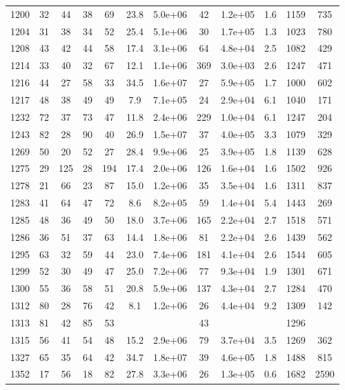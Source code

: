 \begin{table}
\begin{tabular}{cccccccccccc}
1200 & 32 & 44 & 38 & 69 & 23.8 & 5.0e+06 & 42 & 1.2e+05 & 1.6 & 1159 & 735 \\
1204 & 31 & 38 & 34 & 52 & 25.4 & 5.1e+06 & 30 & 1.7e+05 & 1.3 & 1023 & 780 \\
1208 & 43 & 42 & 44 & 58 & 17.4 & 3.1e+06 & 64 & 4.8e+04 & 2.5 & 1082 & 429 \\
1214 & 33 & 40 & 32 & 67 & 12.1 & 1.1e+06 & 369 & 3.0e+03 & 2.6 & 1247 & 471 \\
1216 & 44 & 27 & 58 & 33 & 34.5 & 1.6e+07 & 27 & 5.9e+05 & 1.7 & 1000 & 602 \\
1217 & 48 & 38 & 49 & 49 & 7.9 & 7.1e+05 & 24 & 2.9e+04 & 6.1 & 1040 & 171 \\
1232 & 72 & 37 & 73 & 47 & 11.8 & 2.4e+06 & 229 & 1.0e+04 & 6.1 & 1247 & 204 \\
1243 & 82 & 28 & 90 & 40 & 26.9 & 1.5e+07 & 37 & 4.0e+05 & 3.3 & 1079 & 329 \\
1269 & 50 & 20 & 52 & 27 & 28.4 & 9.9e+06 & 25 & 3.9e+05 & 1.8 & 1139 & 628 \\
1275 & 29 & 125 & 28 & 194 & 17.4 & 2.0e+06 & 126 & 1.6e+04 & 1.6 & 1502 & 926 \\
1278 & 21 & 66 & 23 & 87 & 15.0 & 1.2e+06 & 35 & 3.5e+04 & 1.6 & 1311 & 837 \\
1283 & 41 & 64 & 47 & 72 & 8.6 & 8.2e+05 & 59 & 1.4e+04 & 5.4 & 1443 & 269 \\
1285 & 48 & 36 & 49 & 50 & 18.0 & 3.7e+06 & 165 & 2.2e+04 & 2.7 & 1518 & 571 \\
1286 & 36 & 51 & 37 & 63 & 14.4 & 1.8e+06 & 81 & 2.2e+04 & 2.6 & 1439 & 562 \\
1295 & 63 & 32 & 59 & 44 & 23.0 & 7.4e+06 & 181 & 4.1e+04 & 2.6 & 1544 & 605 \\
1299 & 52 & 30 & 49 & 47 & 25.0 & 7.2e+06 & 77 & 9.3e+04 & 1.9 & 1301 & 671 \\
1300 & 55 & 36 & 58 & 51 & 20.8 & 5.9e+06 & 137 & 4.3e+04 & 2.7 & 1284 & 470 \\
1312 & 80 & 28 & 76 & 42 & 8.1 & 1.2e+06 & 26 & 4.4e+04 & 9.2 & 1309 & 142 \\
1313 & 81 & 42 & 85 & 53 &  &  & 43 &  &  & 1296 &  \\
1315 & 56 & 41 & 54 & 48 & 15.2 & 2.9e+06 & 79 & 3.7e+04 & 3.5 & 1269 & 362 \\
1327 & 65 & 35 & 64 & 42 & 34.7 & 1.8e+07 & 39 & 4.6e+05 & 1.8 & 1488 & 815 \\
1352 & 17 & 56 & 18 & 82 & 27.8 & 3.3e+06 & 26 & 1.3e+05 & 0.6 & 1682 & 2590 \\

\end{tabular}
\end{table}
